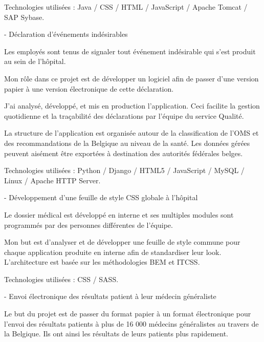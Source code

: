 \begin{cventries}
{    Technologies utilisées : Java / CSS / HTML / JavaScript / Apache Tomcat / SAP Sybase.

    }
    
    
    
    
  \cventry
    {-} %
    {Déclaration d'événements indésirables} %
    {} %
    {} %
    {
    Les employés sont tenus de signaler tout événement indésirable qui s'est produit au sein de l'hôpital.
    
    Mon rôle dans ce projet est de développer un logiciel afin de passer d'une version papier à une version électronique de cette déclaration.
    
    J'ai analysé, développé, et mis en production l'application.
    Ceci facilite la gestion quotidienne et la traçabilité des déclarations par l'équipe du service Qualité.
    
    La structure de l'application est organisée autour de la classification de l'OMS et des recommandations de la Belgique au niveau de la santé. Les données gérées peuvent aisément être exportées à destination des autorités fédérales belges.

    Technologies utilisées : Python / Django / HTML5 / JavaScript / MySQL / Linux / Apache HTTP Server.

    }
    
    
  \cventry
    {-} %
    {Développement d'une feuille de style CSS globale à l'hôpital} %
    {} %
    {} %
    {
    Le dossier médical est développé en interne et ses multiples modules sont programmés par des personnes différentes de l'équipe.
    
    Mon but est d'analyser et de développer une feuille de style commune pour chaque application produite en interne afin de standardiser leur look. L'architecture est basée sur les méthodologies BEM et ITCSS.


    Technologies utilisées : CSS / SASS.

    }
    
    
  \cventry
    {-} %
    {Envoi électronique des résultats patient à leur médecin généraliste} %
    {} %
    {} %
    {
    Le but du projet est de passer du format papier à un format électronique pour l'envoi des résultats patients à plus de 16 000 médecins généralistes au travers de la Belgique. Ils ont ainsi les résultats de leurs patients plus rapidement.
    
}
\end{cventries}
